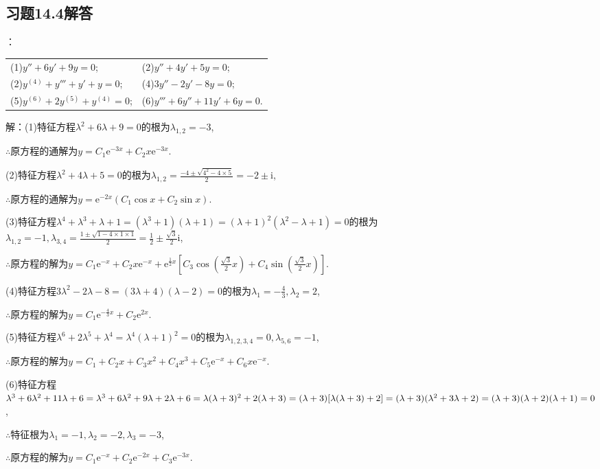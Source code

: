 \documentclass[12pt,UTF8,fleqn]{ctexart}
\newcommand{\me}[0]{\mathrm e}
\newcommand{\m}[0]{\mathrm }
\begin{document}
\subsection{习题14.4解答}
\begin{enumerate}
：\\
\begin{tabular}{ll}
(1)$y''+6y'+9y=0$;&(2)$y''+4y'+5y=0$;\\
(2)$y^{(4)}+y'''+y'+y=0$;&(4)$3y''-2y'-8y=0$;\\
(5)$y^{(6)}+2y^{(5)}+y^{(4)}=0$;&(6)$y'''+6y''+11y'+6y=0$.
\end{tabular}

解：(1)特征方程$\lambda^2+6\lambda+9=0$的根为$\lambda_{1,2}=-3$,

$\therefore$原方程的通解为$y=C_1\me^{-3x}+C_2x\me^{-3x}$.

(2)特征方程$\lambda^2+4\lambda+5=0$的根为$\lambda_{1,2}=\frac{-4\pm\sqrt{4^2-4\times5}}2=-2\pm\mathrm i$,

$\therefore$原方程的通解为$y=\me^{-2x}(C_1\cos x+C_2\sin x)$.

(3)特征方程$\lambda^4+\lambda^3+\lambda+1=(\lambda^3+1)(\lambda+1)=(\lambda+1)^2(\lambda^2-\lambda+1)=0$的根为\\
$\lambda_{1,2}=-1,\lambda_{3,4}=\frac{1\pm\sqrt{1-4\times1\times1}}2=\frac12\pm\frac{\sqrt 3}2\m i$,

$\therefore$原方程的解为$y=C_1\me^{-x}+C_2x\me^{-x}+\me^{\frac12x}[C_3\cos(\frac{\sqrt 3}2x)+C_4\sin(\frac{\sqrt 3}2x)]$.

(4)特征方程$3\lambda^2-2\lambda-8=(3\lambda+4)(\lambda-2)=0$的根为$\lambda_1=-\frac43,\lambda_2=2$,

$\therefore$原方程的解为$y=C_1\me^{-\frac43x}+C_2\me^{2x}$.

(5)特征方程$\lambda^6+2\lambda^5+\lambda^4=\lambda^4(\lambda+1)^2=0$的根为$\lambda_{1,2,3,4}=0,\lambda_{5,6}=-1$,

$\therefore$原方程的解为$y=C_1+C_2x+C_3x^2+C_4x^3+C_5\me^{-x}+C_6x\me^{-x}$.

(6)特征方程$\lambda^3+6\lambda^2+11\lambda+6=\lambda^3+6\lambda^2+9\lambda+2\lambda+6=\lambda(\lambda+3)^2+2(\lambda+3)\\
=(\lambda+3)[\lambda(\lambda+3)+2]=(\lambda+3)(\lambda^2+3\lambda+2)=(\lambda+3)(\lambda+2)(\lambda+1)=0$,

$\therefore$特征根为$\lambda_1=-1,\lambda_2=-2,\lambda_3=-3$,

$\therefore$原方程的解为$y=C_1\me^{-x}+C_2\me^{-2x}+C_3\me^{-3x}$.


\end{enumerate}
\end{document}
